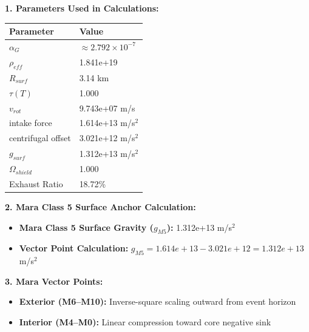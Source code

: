 \documentclass[11pt, a4paper]{article}
\begin{document}
\vspace{0.5em}
\noindent \textbf{1. Parameters Used in Calculations:}
\begin{center}
  \begin{tabular}{|l|l|}
    \hline
    \textbf{Parameter} & \textbf{Value} \\ \hline
    $\alpha_G$ & $\approx 2.792 \times 10^{-7}$ \\ \hline
    $\rho_{eff}$ & 1.841e+19 \\ \hline
    $R_{surf}$ & 3.14 km \\ \hline
    $\tau(T)$ & 1.000 \\ \hline
    $v_{rot}$ & 9.743e+07 m/s \\ \hline
    intake force & 1.614e+13 m/s$^2$ \\ \hline
    centrifugal offset & 3.021e+12 m/s$^2$ \\ \hline
    $g_{surf}$ & 1.312e+13 m/s$^2$ \\ \hline
    $\Omega_{shield}$ & 1.000 \\ \hline
    Exhaust Ratio & 18.72\% \\ \hline
  \end{tabular}
\end{center}

\vspace{0.5em}
\noindent \textbf{2. Mara Class 5 Surface Anchor Calculation:}
\begin{itemize}
  \item \textbf{Mara Class 5 Surface Gravity ($g_{M5}$):} 1.312e+13 m/s$^2$
  \item \textbf{Vector Point Calculation:} $g_{M5} = 1.614e+13 - 3.021e+12 = 1.312e+13$ m/s$^2$
\end{itemize}

\vspace{0.5em}
\noindent \textbf{3. Mara Vector Points:}
\begin{itemize}
  \item \textbf{Exterior (M6--M10):} Inverse-square scaling outward from event horizon
  \item \textbf{Interior (M4--M0):} Linear compression toward core negative sink
\end{itemize}
\end{document}
